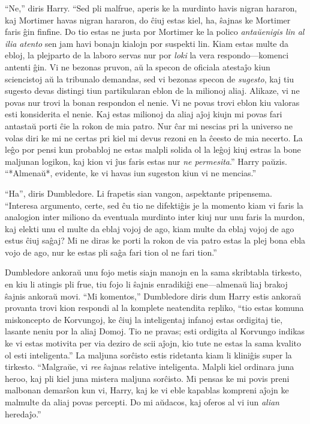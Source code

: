``Ne,'' diris Harry. ``Sed pli malfrue, aperis ke la murdinto havis
nigran hararon, kaj Mortimer havas nigran hararon, do ĉiuj estas kiel,
ha, ŝajnas ke Mortimer faris ĝin finfine. Do tio estas ne justa por
Mortimer ke la polico \emph{antaŭenigis lin al ilia atento} sen jam
havi bonajn kialojn por suspekti lin. Kiam estas multe da ebloj, la
plejparto de la laboro servas nur por \emph{loki} la vera
respondo—komenci antenti ĝin. Vi ne bezonas pruvon, aŭ la specon de
oficiala atestaĵo kiun sciencistoj aŭ la tribunalo demandas, sed vi
bezonas specon de \emph{sugesto}, kaj tiu sugesto devas distingi tiun
partikularan eblon de la milionoj aliaj. Alikaze, vi ne povas nur
trovi la bonan respondon el nenie. Vi ne povas trovi eblon kiu valoras
esti konsiderita el nenie. Kaj estas milionoj da aliaj aĵoj kiujn mi
povas fari antastaŭ porti ĉie la rokon de mia patro. Nur ĉar mi
nescias pri la universo ne volas diri ke mi ne certas pri kiel mi
devus rezoni en la ĉeesto de mia necerto. La leĝo por pensi kun
probabloj ne estas malpli solida ol la leĝoj kiuj estras la bone
maljunan logikon, kaj kion vi ĵus faris estas nur \emph{ne
permesita}.'' Harry paŭzis. ``*Almenaŭ*, evidente, ke vi havas iun
sugeston kiun vi ne mencias.''

``Ha'', diris Dumbledore. Li frapetis sian vangon, aspektante
pripensema. ``Interesa argumento, certe, sed ĉu tio ne difektiĝis je
la momento kiam vi faris la analogion inter miliono da eventuala
murdinto inter kiuj nur unu faris la murdon, kaj elekti unu el multe da
eblaj vojoj de ago, kiam multe da eblaj vojoj de ago estus ĉiuj saĝaj? Mi
ne diras ke porti la rokon de via patro estas la plej bona ebla vojo
de ago, nur ke estas pli saĝa fari tion ol ne fari tion.''

Dumbledore ankoraŭ unu fojo metis siajn manojn en la sama skribtabla
tirkesto, en kiu li atingis pli frue, tiu fojo li ŝajnis enradikiĝi
ene—almenaŭ liaj brakoj ŝajnis ankoraŭ movi. ``Mi komentos,''
Dumbledore diris dum Harry estis ankoraŭ provanta trovi kion respondi
al la komplete neatendita repliko, ``tio estas komuna miskoncepto de
Korvungoj, ke ĉiuj la inteligentaj infanoj estas ordigitaj tie,
lasante neniu por la aliaj Domoj. Tio ne pravas; esti ordigita al
Korvungo indikas ke vi estas motivita per via deziro de scii aĵojn,
kio tute ne estas la sama kvalito ol esti inteligenta.'' La maljuna
sorĉisto estis ridetanta kiam li kliniĝis super la
tirkesto. ``Malgraŭe, vi \emph{ree} ŝajnas relative
inteligenta. Malpli kiel ordinara juna heroo, kaj pli kiel juna
mistera maljuna sorĉisto. Mi pensas ke mi povis preni malbonan
demarŝon kun vi, Harry, kaj ke vi eble kapablas kompreni aĵojn ke
malmulte da aliaj povas percepti. Do mi aŭdacos, kaj oferos al vi iun
\emph{alian} heredaĵo.''

